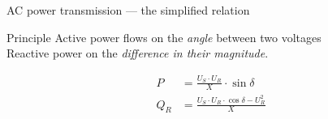 %

\begin{frame}{AC power transmission --- the simplified relation}
  \begin{block}{Principle}
    {Active power flows on the \emph{angle} between two voltages\\
    Reactive power on the \emph{difference in their magnitude}.}
  \end{block}

  \vspace{1em}
  \[
    \begin{aligned}
      P   &= \frac{U_S\cdot U_R}{X}\cdot\sin\delta \\[2ex]
      Q_R &= \frac{U_S\cdot U_R\cdot\cos\delta - U_R^2}{X}
    \end{aligned}
  \]
\end{frame}
